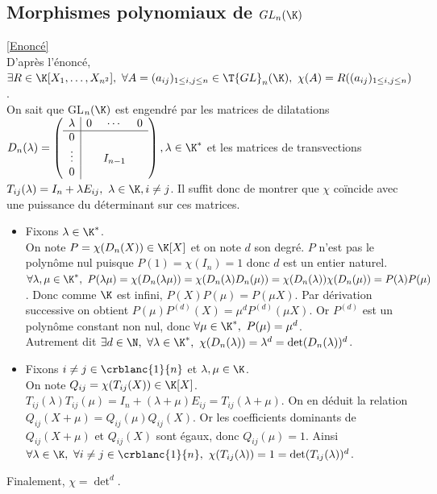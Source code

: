 \documentclass[8pt]{book}
\begin{document}
	\subsection{Morphismes polynomiaux de $GL_n(\K)$ }
	\label{Morphismes polynomiaux de GLn(K) corrigé}
	\textcolor{blue}{\hyperref[Morphismes polynomiaux de GLn(K)]{[Enoncé]}}\\
	D'après l'énoncé, $\exists R\in \K[X_1,\dots,X_{n^2}],\ \forall A=(a_{ij})_{1\leq i,j\leq n}\in \T{GL}_n(\K),\ \chi(A)=R((a_{ij})_{1\leq i,j\leq n})$.\\
	On sait que GL$_n(\K)$ est engendré par les matrices de dilatations $D_n(\lambda)=\left(\begin{array}{c|ccc}
		\lambda & 0 & \cdots & 0\\
		\hline
		0 & & &\\
		\vdots& & I_{n-1} &\\
		0 & & &
	\end{array}\right),\lambda\in \K^*$ et les matrices de transvections $T_{ij}(\lambda)=I_n+\lambda E_{ij},\ \lambda\in \K,i\ne j$. Il suffit donc de montrer que $\chi$ coïncide avec une puissance du déterminant sur ces matrices.
	\begin{itemize}
		\item Fixons $\lambda\in \K^*$.\\
		On note $P=\chi(D_n(X))\in \K[X]$ et on note $d$ son degré. $P$ n'est pas le polynôme nul puisque $P(1)=\chi(I_n)=1$ donc $d$ est un entier naturel.\\
		$\forall \lambda,\mu\in \K^*,\ P(\lambda\mu)=\chi(D_n(\lambda\mu))=\chi(D_n(\lambda)D_n(\mu))=\chi(D_n(\lambda))\chi(D_n(\mu))=P(\lambda)P(\mu)$. Donc comme $\K$ est infini, $P(X)P(\mu)=P(\mu X)$. Par dérivation successive on obtient $P(\mu)P^{(d)}(X)=\mu^d P^{(d)}(\mu X)$. Or $P^{(d)}$ est un polynôme constant non nul, donc $\forall \mu\in \K^*,\ P(\mu)=\mu^d$.\\
		Autrement dit $\exists d\in \N,\ \forall \lambda\in \K^*,\ \chi(D_n(\lambda))=\lambda^d=\det(D_n(\lambda))^d$.
		\item Fixons $i\ne j\in \crblanc{1}{n}$ et $\lambda,\mu\in \K$.\\
		On note $Q_{ij}=\chi(T_{ij}(X))\in \K[X]$. $T_{ij}(\lambda)T_{ij}(\mu)=I_n+(\lambda+\mu)E_{ij}=T_{ij}(\lambda+\mu)$. On en déduit la relation $Q_{ij}(X+\mu)=Q_{ij}(\mu)Q_{ij}(X)$. Or les coefficients dominants de $Q_{ij}(X+\mu)$ et $Q_{ij}(X)$ sont égaux, donc $Q_{ij}(\mu)=1$. Ainsi $\forall \lambda\in \K,\ \forall i\ne j\in\crblanc{1}{n},\ \chi(T_{ij}(\lambda))=1=\det(T_{ij}(\lambda))^d$.
	\end{itemize}
	Finalement, $\chi=\det^d$.\\
	
\end{document}
